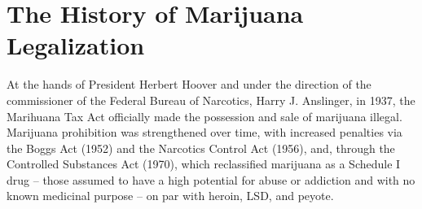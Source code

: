 




\section{The History of Marijuana Legalization}

At the hands of President Herbert Hoover and under the direction of the commissioner of the Federal Bureau of Narcotics, Harry J. Anslinger, in 1937, the Marihuana Tax Act officially made the possession and sale of marijuana illegal. Marijuana prohibition was strengthened over time, with increased penalties via the Boggs Act (1952) and the Narcotics Control Act (1956), and, through the Controlled Substances Act (1970), which reclassified marijuana as a Schedule I drug -- those assumed to have a high potential for abuse or addiction and with no known medicinal purpose -- on par with heroin, LSD, and peyote. 



